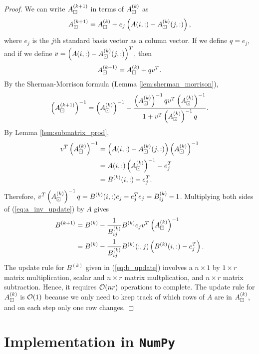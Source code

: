 \documentclass{article}
\begin{document}
	\begin{proof}
		We can write $A_\boxdot^{(k+1)}$ in terms of $A_\boxdot^{(k)}$ as
		\begin{equation}
			A_\boxdot^{(k+1)} = A_\boxdot^{(k)} + e_j\left(A(i,:) - A_\boxdot^{(k)}(j,:)\right),
		\end{equation}
		where $e_j$ is the $j$th standard basis vector as a column vector. If we define $q = e_j$, and if we define $v = \left(A(i,:) - A_\boxdot^{(k)}(j,:)\right)^T$, then
		\begin{equation}
			A_\boxdot^{(k+1)} = A_\boxdot^{(k)} + qv^T.
		\end{equation}
		By the Sherman-Morrison formula (Lemma \ref{lem:sherman_morrison}),
		\begin{equation}
			\label{eq:a_inv_update}
			\left(A_\boxdot^{(k+1)}\right)^{-1} = \left(A_\boxdot^{(k)}\right)^{-1} - \frac{\left(A_\boxdot^{(k)}\right)^{-1}qv^T\left(A_\boxdot^{(k)}\right)^{-1}}{1 +v^T\left(A_\boxdot^{(k)}\right)^{-1}q}.
		\end{equation}
		By Lemma \ref{lem:submatrix_prod},
		\begin{align}
			v^T\left(A_\boxdot^{(k)}\right)^{-1} &= \left(A(i,:) - A_\boxdot^{(k)}(j,:)\right)\left(A_\boxdot^{(k)}\right)^{-1} \\
			&= A(i,:)\left(A_\boxdot^{(k)}\right)^{-1} - e_j^T \\
			&= B^{(k)}(i,:) - e_j^T.
		\end{align}
		Therefore, $v^T\left(A_\boxdot^{(k)}\right)^{-1}q = B^{(k)}(i,:)e_j - e_j^Te_j = B^{(k)}_{ij}-1$.
		Multiplying both sides of (\ref{eq:a_inv_update}) by $A$ gives
		\begin{align}
			B^{(k+1)} &= B^{(k)} - \frac{1}{B^{(k)}_{ij}}B^{(k)}e_jv^T\left(A_\boxdot^{(k)}\right)^{-1} \\
			\label{eq:b_update}
			&=B^{(k)} - \frac{1}{B^{(k)}_{ij}}B^{(k)}(:,j)\left(B^{(k)}(i,:) - e_j^T\right).
		\end{align}
		The update rule for $B^{(k)}$ given in (\ref{eq:b_update}) involves a $n\times 1$ by $1\times r$ matrix multiplication, scalar and $n\times r$ matrix multplication, and $n\times r$ matrix subtraction. Hence, it requires $\mathcal{O}(nr)$ operations to complete. The update rule for $A_\boxdot^{(k)}$ is $\mathcal{O}(1)$ because we only need to keep track of which rows of $A$ are in $A_\boxdot^{(k)}$, and on each step only one row changes. 
		
	\end{proof}
	
	\section{Implementation in \texttt{NumPy}}
	
\end{document}
